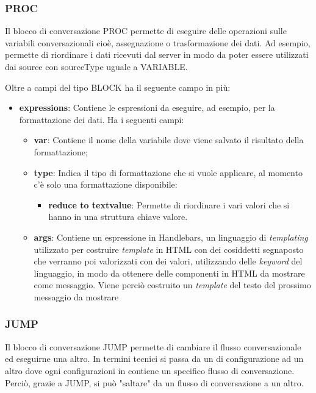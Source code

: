 \subsubsection{PROC}
Il blocco di conversazione PROC permette di eseguire delle operazioni sulle variabili conversazionali cioè, assegnazione o trasformazione dei dati. Ad esempio, permette di riordinare i dati ricevuti dal server in modo da poter essere utilizzati dai source con sourceType uguale a VARIABLE.


Oltre a campi del tipo BLOCK ha il seguente campo in più:

\begin{itemize}
	\item \textbf{expressions}: Contiene le espressioni da eseguire, ad esempio, per la formattazione dei dati.
	Ha i seguenti campi:
	\begin{itemize}
		\item \textbf{var}: Contiene il nome della variabile dove viene salvato il risultato della formattazione;
		\item \textbf{type}: Indica il tipo di formattazione che si vuole applicare, al momento c'è solo una formattazione disponibile:
		\begin{itemize}
			\item \textbf{reduce to textvalue}: Permette di riordinare i vari valori che si hanno in una struttura chiave valore.
		\end{itemize}
		\item \textbf{args}: Contiene un espressione in Handlebars, un linguaggio di \emph{templating} utilizzato per costruire \emph{template} in \gls{HTML} con dei cosiddetti segnaposto che verranno poi valorizzati con dei valori, utilizzando delle \emph{keyword} del linguaggio, in modo da ottenere delle componenti in \gls{HTML} da mostrare come messaggio. Viene perciò costruito un \emph{template} del testo del prossimo messaggio da mostrare
	\end{itemize}
\end{itemize}

\subsubsection{JUMP}

Il blocco di conversazione JUMP permette di cambiare il flusso conversazionale ed eseguirne una altro. In termini tecnici si passa da un  di configurazione ad un altro dove ogni configurazioni in  contiene un specifico flusso di conversazione. Perciò, grazie a JUMP, si può "saltare" da un flusso di conversazione a un altro. \\

